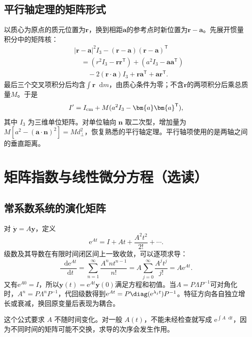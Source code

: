 \documentclass[11pt,openany,fontset=fandol]{ctexbook}
\theoremstyle{plain}\newtheorem{theorem}{定理}[chapter]\newtheorem{proposition}[theorem]{命题}
\theoremstyle{definition}\newtheorem{definition}{定义}[chapter]\newtheorem{example}{例}[chapter]
\theoremstyle{remark}\newtheorem*{remark}{说明}
\newcommand{\dd}{\mathop{}\!\mathrm d}\newcommand{\ii}{\mathrm i}\newcommand{\ee}{\mathrm e}
\newcommand{\vct}[1]{\bm{#1}}\newcommand{\Rea}{\operatorname{Re}}\newcommand{\Ima}{\operatorname{Im}}
\begin{document}
\subsection{平行轴定理的矩阵形式}
以质心为原点的质元位置为$\vct r$，换到相距$\vct a$的参考点时新位置为$\vct r-\vct a$。先展开惯量积分中的矩阵核：
\[
\begin{aligned}
&|\vct r-\vct a|^2I_3-(\vct r-\vct a)(\vct r-\vct a)^{\mathsf T}\\
&\quad=(r^2I_3-\vct r\vct r^{\mathsf T})+(a^2I_3-\vct a\vct a^{\mathsf T})\\
&\qquad-2(\vct r\cdot\vct a)I_3
+\vct r\vct a^{\mathsf T}+\vct a\vct r^{\mathsf T}.
\end{aligned}
\]
最后三个交叉项积分后均含$\int\vct r\dd m$，由质心条件为零；不含$\vct r$的两项积分后乘总质量$M$。于是
\begin{equation}
I'=I_{\rm cm}+M(a^2I_3-\vct a\vct a^{\mathsf T}),
\end{equation}
其中 $I_3$ 为三维单位矩阵。对单位轴向 $\vct n$ 取二次型，增加量为 $M[a^2-(\vct a\cdot\vct n)^2]=Md_\perp^2$，恢复熟悉的平行轴定理。平行轴项使用的是两轴之间的垂直距离。

\section{矩阵指数与线性微分方程（选读）}
\subsection{常系数系统的演化矩阵}
对 $\dot{\vct y}=A\vct y$，定义
\[
\ee^{At}=I+At+\frac{A^2t^2}{2!}+\cdots.
\]
级数及其导数在有限时间闭区间上一致收敛，可以逐项求导：
\[\frac{\dd\ee^{At}}{\dd t}
=\sum_{n=1}^{\infty}\frac{A^nnt^{n-1}}{n!}
=A\sum_{j=0}^{\infty}\frac{A^jt^j}{j!}=A\ee^{At}.\]
又有$\ee^{A0}=I$，所以$\vct y(t)=\ee^{At}\vct y(0)$满足方程和初值。当$A=P\Lambda P^{-1}$可对角化时，$A^n=P\Lambda^nP^{-1}$，代回级数得到$\ee^{At}=P\diag(\ee^{\lambda_jt})P^{-1}$。特征方向各自独立增长或衰减，换回原变量后表现为耦合。

这个公式要求 $A$ 不随时间变化。对一般 $A(t)$，不能未经检查就写成 $\ee^{\int A\dd t}$，因为不同时间的矩阵可能不交换，求导的次序会发生作用。
\end{document}

